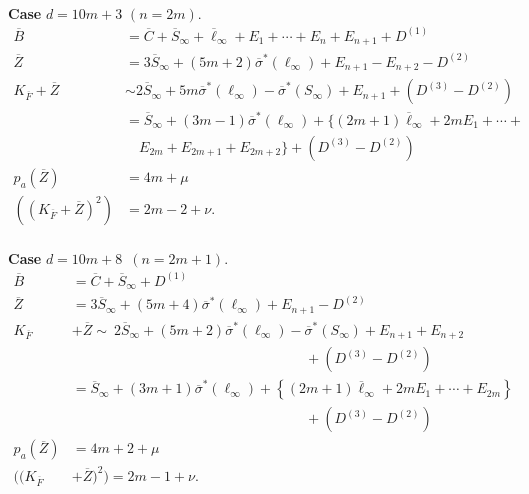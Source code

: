 \paragraph{}\label{chap3:3.5.3.1}
{\bf Case} $d=10m+3$ $(n=2m)$.
\begin{align*}
\overline{B} &=
\overline{C}+\overline{S}_{\infty}+\overline{\ell}_{\infty}+E_{1}+\cdots+E_{n}+E_{n+1}+D^{(1)}\\
\overline{Z} &=
3\overline{S}_{\infty}+(5m+2)\overline{\sigma}^{\ast}(\ell_{\infty})+E_{n+1}-E_{n+2}-D^{(2)}\\
K_{\overline{F}}+\overline{Z} &\sim
2\overline{S}_{\infty}+5m\overline{\sigma}^{\ast} (\ell_{\infty}) -
\overline{\sigma}^{\ast} (S_{\infty})+E_{n+1}+(D^{(3)}-D^{(2)})\\
&= \overline{S}_{\infty} + (3m-1) \overline{\sigma}^{\ast}
(\ell_{\infty}) + \Big\{(2m+1)\overline{\ell}_{\infty}+2mE_{1} + \cdots +
\\
& \quad  E_{2m}+E_{2m+1}+E_{2m+2}\Big\}+(D^{(3)}-D^{(2)})\\
p_{a}(\overline{Z}) &= 4m+\mu\\
((K_{\overline{F}}+\overline{Z})^{2}) &= 2m-2+\nu.
\end{align*}

\paragraph{}\label{chap3:3.5.3.2}
{\bf Case} $d=10m+8$\pageoriginale\ $(n=2m+1)$.
\begin{align*}
\overline{B} &= \overline{C}+\overline{S}_{\infty}+D^{(1)}\\
\overline{Z} &= 3\overline{S}_{\infty}+(5m+4)\overline{\sigma}^{\ast}(\ell_{\infty})+E_{n+1}-D^{(2)}\\ 
K_{\overline{F}}& +\overline{Z}  \sim  ~2\overline{S}_{\infty} + (5m+2)
\overline{\sigma}^{\ast}(\ell_{\infty})-\overline{\sigma}^{\ast} 
(S_{\infty})+E_{n+1}+E_{n+2}\\
& \hspace{7cm}+ \left(D^{(3)}-D^{(2)}\right)\\
& = \overline{S}_{\infty}+(3m+1)\overline{\sigma}^{\ast}
(\ell_{\infty}) +
\left\{(2m+1)\overline{\ell}_{\infty}+2mE_{1}+\cdots+E_{2m}\right\}\\ 
& \hspace{7cm}+ \left(D^{(3)}-D^{(2)}\right)\\
p_{a}(\overline{Z}) &= 4m+2+\mu\\
((K_{\overline{F}}& +\overline{Z})^{2}) = 2m-1+\nu. 
\end{align*}


